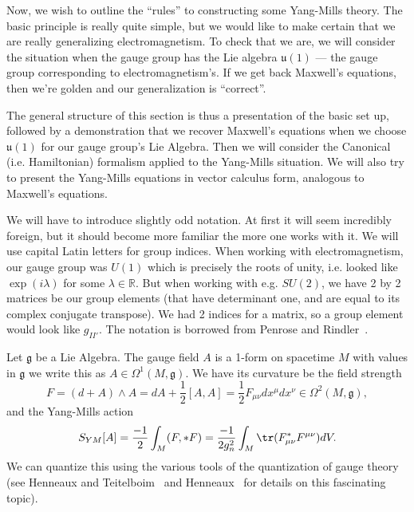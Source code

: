 
Now, we wish to outline the ``rules'' to constructing some Yang-Mills
theory. The basic principle is really quite simple, but we would like
to make certain that we are really generalizing electromagnetism. To
check that we are, we will consider the situation when the gauge 
group has the Lie algebra $\mathfrak{u}(1)$ --- the gauge group 
corresponding to electromagnetism's. If we get back Maxwell's 
equations, then we're golden and our generalization is
``correct''.

The general structure of this section is thus a presentation of
the basic set up, followed by a demonstration that we recover
Maxwell's equations when we choose $\mathfrak{u}(1)$ for our
gauge group's Lie Algebra. Then we will consider the Canonical
(i.e. Hamiltonian) formalism applied to the Yang-Mills
situation. We will also try to present the Yang-Mills equations
in vector calculus form, analogous to Maxwell's equations.

We will have to introduce slightly odd notation. At first it will
seem incredibly foreign, but it should become more familiar the
more one works with it. We will use capital Latin letters for
group indices. When working with electromagnetism, our gauge
group was $U(1)$ which is precisely the roots of unity,
i.e. looked like $\exp(i\lambda)$ for some
$\lambda\in\mathbb{R}$. But when working with e.g. $SU(2)$, we
have 2 by 2 matrices be our group elements (that have determinant
one, and are equal to its complex conjugate transpose). We had 2
indices for a matrix, so a group element would look like
$g_{II'}$. The notation is borrowed from Penrose and Rindler~\cite{penroseRindlerOne,penroseRindlerTwo}.

Let $\mathfrak{g}$ be a Lie Algebra. The gauge field $A$ is a 1-form
on spacetime $M$ with values in $\mathfrak{g}$ we write this as
$A\in\Omega^{1}(M,\mathfrak{g})$. We have its curvature be the
field strength
\begin{equation}%
F=(d+A)\wedge A=dA+\frac{1}{2}[A,A]=\frac{1}{2}F_{\mu\nu}dx^{\mu}dx^{\nu}\in\Omega^{2}(M,\mathfrak{g}),
\end{equation}
and the Yang-Mills action
\begin{equation}
S_{YM}[A] =
\frac{-1}{2}\int_{M}(F,*F)=\frac{-1}{2g^{2}_{n}}\int_{M}\tr(F^{*}_{\mu\nu}F^{\mu\nu})dV.
\end{equation}
We can quantize this using the various tools of the quantization
of gauge theory (see Henneaux and Teitelboim~\cite{Henneaux:1985kr} and
Henneaux~\cite{Henneaux:1992ig} for details on this fascinating topic).
